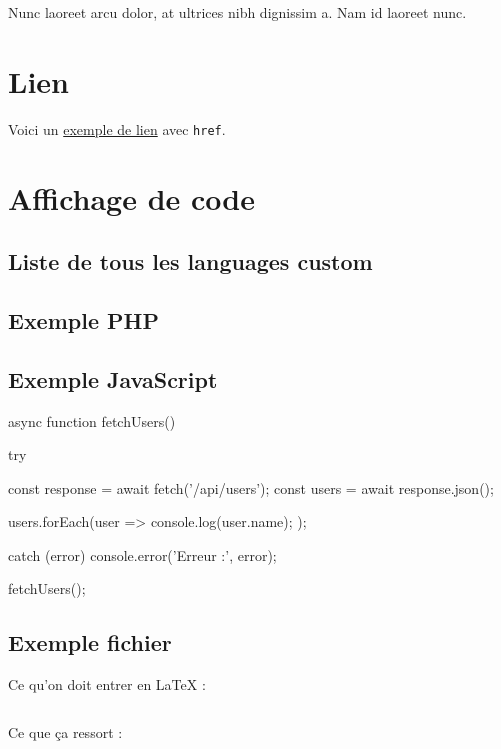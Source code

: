 \documentclass[french]{report}
\begin{document}
\begin{boxValidation}[boxValidation]
    Nunc laoreet arcu dolor, at ultrices nibh dignissim a. Nam id laoreet nunc.
\end{boxValidation}

\chapter{Lien}
Voici un \href{https://perdu.com/}{exemple de lien} avec \texttt{href}.

\chapter{Affichage de code}

\section{Liste de tous les languages custom}


\section{Exemple PHP}


\section{Exemple JavaScript}
\begin{jscode}[caption=Fetch API async/await]
	async function fetchUsers() {
	try {
	const response = await fetch('/api/users');
	const users = await response.json();

	users.forEach(user => {
	console.log(user.name);
	});
	} catch (error) {
			console.error('Erreur :', error);
		}
	}
	fetchUsers();
\end{jscode}


\section{Exemple fichier}

Ce qu'on doit entrer en {\LaTeX} :
\begin{lstlisting}[style=styleCode]

\end{lstlisting}

Ce que ça ressort :

\end{document}
